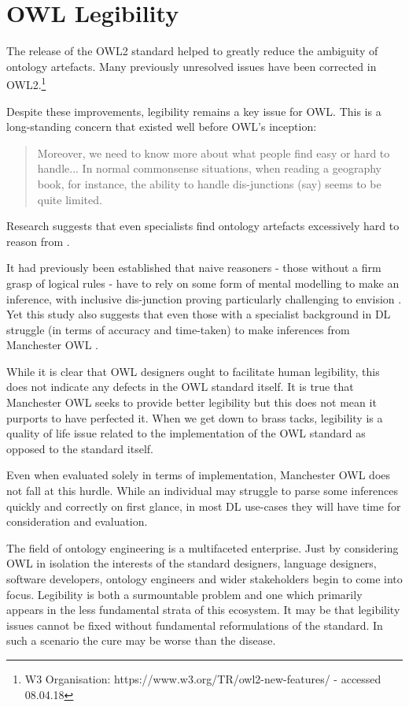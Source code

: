 \documentclass[titlepage,a4paper,12pt,oneside]{book}
\begin{document}
\section{OWL Legibility}
The release of the OWL2 standard helped to greatly reduce the ambiguity of ontology artefacts.
Many previously unresolved issues \cite[1]{problems2006} have been corrected in OWL2.\footnote{W3 Organisation: https://www.w3.org/TR/owl2-new-features/ - accessed 08.04.18}\par
Despite these improvements, legibility remains a key issue for OWL.
This is a long-standing concern that existed well before OWL's inception:
\begin{quote}
  Moreover, we need to know more about what people find easy or hard to handle... In normal commonsense situations, when reading a geography book, for instance, the ability to handle dis-junctions (say) seems to be quite limited. \cite[89]{expressiveness1987}
\end{quote}
Research suggests that even specialists find ontology artefacts excessively hard to reason from \cite[551]{usability2014}.\par
It had previously been established that naive reasoners - those without a firm grasp of logical rules - have to rely on some form of mental modelling to make an inference, with inclusive dis-junction proving particularly challenging to envision \cite[552]{usability2014}.
Yet this study also suggests that even those with a specialist background in DL struggle (in terms of accuracy and time-taken) to make inferences from Manchester OWL \cite[562]{usability2014}.\par
While it is clear that OWL designers ought to facilitate human legibility, this does not indicate any defects in the OWL standard itself.
It is true that Manchester OWL seeks to provide better legibility but this does not mean it purports to have perfected it.
When we get down to brass tacks, legibility is a quality of life issue related to the implementation of the OWL standard as opposed to the standard itself.\par
Even when evaluated solely in terms of implementation, Manchester OWL does not fall at this hurdle.
While an individual may struggle to parse some inferences quickly and correctly on first glance, in most DL use-cases they will have time for consideration and evaluation.\par
The field of ontology engineering is a multifaceted enterprise.
Just by considering OWL in isolation the interests of the standard designers, language designers, software developers, ontology engineers and wider stakeholders begin to come into focus.
Legibility is both a surmountable problem and one which primarily appears in the less fundamental strata of this ecosystem.
It may be that legibility issues cannot be fixed without fundamental reformulations of the standard.
In such a scenario the cure may be worse than the disease.
\end{document}
